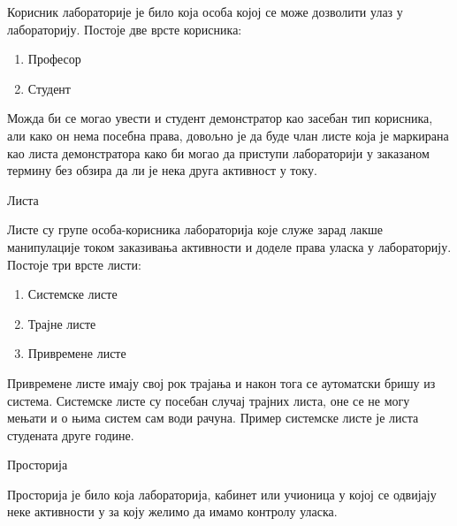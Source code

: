 \documentclass[a4paper, 12pt, diplomski]{etfcyr}
\makeatletter
\gdef\tshortstack{\@ifnextchar[\@tshortstack{\@tshortstack[c]}}
\let\@tshortstack\@shortstack
\makeatother
\begin{document}
\begin{labeling}{\smash{\tshortstack[l]{Корисник\\лабораторије}}}
					\item[\smash{\tshortstack[l]{Корисник\\лабораторије}}]
						\begin{justify}
							Корисник лабораторије је било која особа којој се може дозволити улаз у лабораторију. Постоје две врсте корисника:
							\begin{enumerate}[noitemsep]
								\item Професор
								\item Студент
							\end{enumerate}
							Можда би се могао увести и студент демонстратор као засебан тип корисника, али како он нема посебна права, довољно је да буде члан листе која је маркирана као листа демонстратора како би могао да приступи лабораторији у заказаном термину без обзира да ли је нека друга активност у току.
						\end{justify}

					\item [Листа]
						\begin{justify}
							Листе су групе особа-корисника лабораторија које служе зарад лакше манипулације током заказивања активности и доделе права уласка у лабораторију. Постоје три врсте листи:
							\begin{enumerate}[noitemsep]
								\item Системске листе
								\item Трајне листе
								\item Привремене листе
							\end{enumerate}
							Привремене листе имају свој рок трајања и након тога се аутоматски бришу из система. Системске листе су посебан случај трајних листа, оне се не могу мењати и о њима систем сам води рачуна. Пример системске листе је листа студената друге године.
						\end{justify}

					\item [Просторија]
						\begin{justify}
							Просторија је било која лабораторија, кабинет или учионица у којој се одвијају неке активности у за коју желимо да имамо контролу уласка.
						\end{justify}


\end{labeling}
\end{document}
